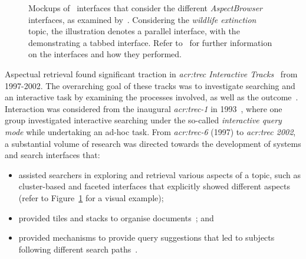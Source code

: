 \begin{figure}[t!]
    \centering
    \caption[Mockups of aspect-based retrieval system interfaces]{Mockups of \searchlogo~interfaces that consider the different \emph{AspectBrowser} interfaces, as examined by~\cite{villa2009aspect_interface}. Considering the \emph{wildlife extinction} topic, the  illustration denotes a parallel interface, with the  demonstrating a tabbed interface. Refer to~\cite{villa2009aspect_interface} for further information on the interfaces and how they performed.}
    \label{fig:tabbed_interface}
\end{figure}

Aspectual retrieval found significant traction in \emph{\gls{acr:trec} Interactive Tracks}~\citep{over2001trec} from 1997-2002. The overarching goal of these tracks was to investigate searching and an interactive task by examining the processes involved, as well as the outcome~\citep{over2001trec}. Interaction was considered from the inaugural \emph{\gls{acr:trec}-1} in 1993~\citep{harman1993trec1}, where one group investigated interactive searching under the so-called \emph{interactive query mode} while undertaking an ad-hoc task. From \emph{\gls{acr:trec}-6} (1997) to \emph{\gls{acr:trec} 2002}, a substantial volume of research was directed towards the development of systems and search interfaces that:

\begin{itemize}
    \item{assisted searchers in exploring and retrieval various aspects of a topic, such as cluster-based and faceted interfaces that explicitly showed different aspects~\citep{mcdonald1998interactive, villa2009aspect_interface} (refer to Figure~\ref{fig:tabbed_interface} for a visual example);}
    \item{provided tiles and stacks to organise documents~\citep{hearst1995tilebars, hearst1997texttiling, harper2006piling, iwata2012tilediversified}; and}
    \item{provided mechanisms to provide query suggestions that led to subjects following different search paths~\citep{kato2012query_suggestion, umemoto2016scentbar}.}
\end{itemize}

